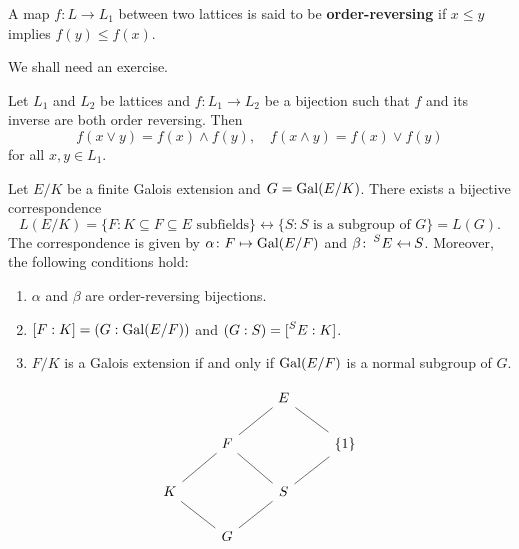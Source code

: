A map $f\colon L\to L_1$ between two lattices is 
said to be \textbf{order-reversing} if 
$x\leq y$ implies $f(y)\leq f(x)$. 

We shall need an exercise. 

\begin{exercise}
\label{xca:order_reversing}
    Let $L_1$ and $L_2$ be lattices and $f\colon L_1\to L_2$ be a bijection 
    such that $f$ and its inverse are both order reversing. Then 
    \[
    f(x\vee y)=f(x)\wedge f(y),\quad 
    f(x\wedge y)=f(x)\vee f(y)
    \]
    for all $x,y\in L_1$. 
\end{exercise}



\begin{theorem}[Galois]
    Let $E/K$ be a finite Galois extension and $G=\operatorname{Gal}(E/K)$. 
    There exists a bijective correspondence
    \[
    L(E/K)=\{F:K\subseteq F\subseteq E\text{ subfields}\}\leftrightarrow
    \{S:S\text{ is a subgroup of $G$}\}=L(G). 
    \]
    The correspondence is given by $\alpha\colon F\mapsto \operatorname{Gal}(E/F)$ and 
    $\beta\colon \prescript{S}{}{E}\mapsfrom S$. Moreover, the following
    conditions hold:
    \begin{enumerate}
        \item $\alpha$ and $\beta$ are order-reversing bijections. 
        \item $[F:K]=(G:\operatorname{Gal}(E/F))$ and $(G:S)=[\prescript{S}{}{E}:K]$.
        \item $F/K$ is a Galois extension if and only if $\operatorname{Gal}(E/F)$ is a normal subgroup of $G$.        
    \end{enumerate}
\end{theorem}

\[
\begin{tikzcd}
	&& E \\
	& F && {\{1\}} \\
	K && S \\
	& G
	\arrow[no head, from=1-3, to=2-2]
	\arrow[no head, from=2-2, to=3-1]
	\arrow[no head, from=3-1, to=4-2]
	\arrow[no head, from=4-2, to=3-3]
	\arrow[no head, from=2-2, to=3-3]
	\arrow[no head, from=1-3, to=2-4]
	\arrow[no head, from=2-4, to=3-3]
\end{tikzcd}
\]

